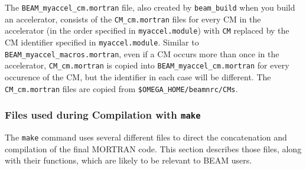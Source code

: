 \documentclass[12pt,twoside]{article}
\begin{document}
The {\tt BEAM\_myaccel\_cm.mortran} file, also created by {\tt beam\_build}
when you build an accelerator, consists of the
{\tt CM\_cm.mortran} files for every CM in the accelerator
(in the order specified in {\tt myaccel.module}) with {\tt CM} replaced
by the CM identifier specified in {\tt myaccel.module}.  Similar to
{\tt BEAM\_myaccel\_macros.mortran}, even if a CM occurs more than
once in the accelerator, {\tt CM\_cm.mortran} is copied into
{\tt BEAM\_myaccel\_cm.mortran} for every occurence of the CM, but the
identifier in each case will be different.  The {\tt CM\_cm.mortran} files
are copied from {\tt \$OMEGA\_HOME/beamnrc/CMs}.

\subsubsection{Files used during Compilation with {\tt make}}
\label{makefilesect}

The {\tt make} command uses several different files to direct the
concatenation and compilation of the final MORTRAN code.  This section describes
those files, along with their functions, which are likely to be relevant
to BEAM users.
\end{document}
